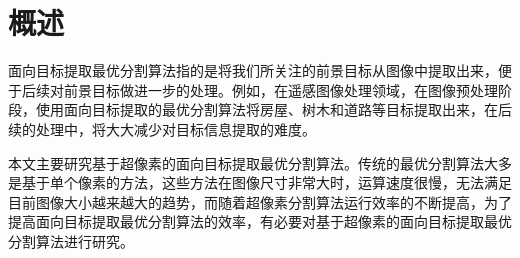 
\section{概述}
面向目标提取最优分割算法指的是将我们所关注的前景目标从图像中提取出来，便于后续对前景目标做进一步的处理。例如，在遥感图像处理领域，在图像预处理阶段，使用面向目标提取的最优分割算法将房屋、树木和道路等目标提取出来，在后续的处理中，将大大减少对目标信息提取的难度。

本文主要研究基于超像素的面向目标提取最优分割算法。传统的最优分割算法大多是基于单个像素的方法，这些方法在图像尺寸非常大时，运算速度很慢，无法满足目前图像大小越来越大的趋势，而随着超像素分割算法运行效率的不断提高，为了提高面向目标提取最优分割算法的效率，有必要对基于超像素的面向目标提取最优分割算法进行研究。

